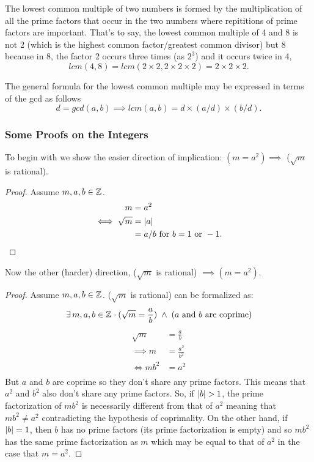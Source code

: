 \documentclass[MathsNotesBase.tex]{subfiles}
\begin{document}
{		\label{sssec:lowest_common_multiple}
		The lowest common multiple of two numbers is formed by the multiplication of all the prime factors that occur in the two numbers where repititions of prime factors are important. That's to say, the lowest common multiple of 4 and 8 is not 2 (which is the highest common factor/greatest common divisor) but 8 because in 8, the factor 2 occurs three times (as $2^3$) and it occurs twice in 4,
		\[ lcm(4,8) = lcm(2\times2, 2\times2\times2) = 2\times2\times2. \]
		
		The general formula for the lowest common multiple may be expressed in terms of the gcd as follows
		\[ d = gcd(a, b) \implies lcm(a, b) = d \times (a/d) \times (b/d). \]
	
	
		
		\pagebreak
		\subsubsection{Some Proofs on the Integers}\bigskip
	
		To begin with we show the easier direction of implication: $(m = a^2) \implies$ ($\sqrt{m}$ is rational).
		\begin{proof}
		Assume $m,a,b \in \mathbb{Z}^{}$.
		\begin{align*}
		m &= a^2 \\
		\iff \sqrt{m} &= \left\lvert a\right\rvert \\
		&= a/b \text{ for } b = 1 \text{ or } -1. \qedhere
		\end{align*}
		\end{proof}
		Now the other (harder) direction, ($\sqrt{m}$ is rational) $\implies (m = a^2)$.
		\begin{proof}
		Assume $m,a,b \in \mathbb{Z}^{}$. ($\sqrt{m}$ is rational) can be formalized as:
		\[ \exists\,m,a,b \in \mathbb{Z}^{} \cdot (\sqrt{m} = \frac{a}{b}) \; \wedge \; \text{($a$ and $b$ are coprime)} \]
		\begin{align*}
		\sqrt{m} &= \frac{a}{b} \\[8pt]
		\implies m &= \frac{a^2}{b^2} \\[8pt]
		\iff mb^2 &= a^2 \\ 
		\end{align*}
		But $a$ and $b$ are coprime so they don't share any prime factors. This means that $a^2$ and $b^2$ also don't share any prime factors. So, if $\left\lvert b\right\rvert > 1$, the prime factorization of $mb^2$ is necessarily different from that of $a^2$ meaning that $mb^2 \neq a^2$ contradicting the hypothesis of coprimality.
		On the other hand, if $\left\lvert b\right\rvert = 1$, then $b$ has no prime factors (its prime factorization is empty) and so $mb^2$ has the same prime factorization as $m$ which may be equal to that of $a^2$ in the case that $m = a^2$.
		\end{proof}
		\bigskip
		
}
\end{document}
